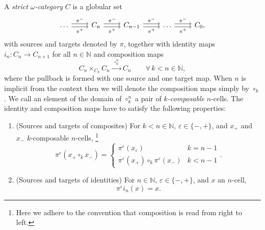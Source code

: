 \documentclass[12pt,a4paper]{article}
\numberwithin{equation}{section}
\begin{document}
\begin{definition}
    A \emph{strict $\omega$-category} $C$ is a globular set
    \begin{equation}
        \begin{tikzcd}
            \dots \arrow[r, shift left=0.5ex, "\pi^-"] \arrow[r, shift right=0.5ex, "\pi^+"'] & C_n \arrow[r, shift left=0.5ex, "\pi^-"] \arrow[r, shift right=0.5ex, "\pi^+"'] & C_{n-1} \arrow[r, shift left=0.5ex, "\pi^-"] \arrow[r, shift right=0.5ex, "\pi^+"'] & \dots \arrow[r, shift left=0.5ex, "\pi^-"] \arrow[r, shift right=0.5ex, "\pi^+"'] & C_0,
        \end{tikzcd}
    \end{equation}
    with sources and targets denoted by $\pi$, together with identity maps $i_{n}: C_n \to C_{n+1}$ for all $n \in \mathbb{N}$ and composition maps
    \begin{equation}
        C_n \mathop{\times}_{C_k} C_n \xrightarrow{\ \ \circ^n_k \ \ } C_n \qquad \forall\, k < n \in \mathbb{N},
    \end{equation}
    where the pullback is formed with one source and one target map. When $n$ is implicit from the context then we will denote the composition maps simply by $\circ_k$. We call an element of the domain of $\circ^n_k$ a pair of \emph{$k$-composable} $n$-cells. The identity and composition maps have to satisfy the following properties:
    \begin{enumerate}
        \item (Sources and targets of composites) For $k < n \in \mathbb{N}$, $\varepsilon \in \{ -, + \}$, and $x_+$ and $x_-$ $k$-composable $n$-cells, \footnote{Here we adhere to the convention that composition is read from right to left.}
        \begin{equation}
            \pi^\varepsilon (x_+ \circ_k x_-) = \begin{cases}
                \pi^\varepsilon (x_\varepsilon) & k = n-1 \\
                \pi^\varepsilon (x_+) \circ_k \pi^\varepsilon (x_-) & k < n-1
            \end{cases}.
        \end{equation}
        \item (Sources and targets of identities) For $n \in \mathbb{N}$, $\varepsilon \in \{ -, + \}$, and $x$ an $n$-cell, 
        \begin{equation}
            \pi^\varepsilon i_n (x) = x.
        \end{equation}

\end{enumerate}
\end{definition}
\end{document}
